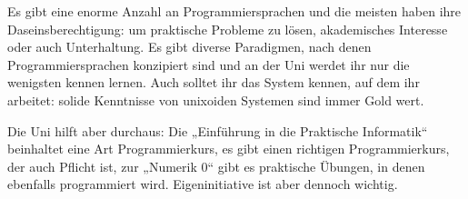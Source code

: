 Es gibt eine enorme Anzahl an Programmiersprachen und die meisten haben ihre
Daseinsberechtigung: um praktische Probleme zu lösen, akademisches Interesse
oder auch Unterhaltung. Es gibt diverse Paradigmen, nach denen
Programmiersprachen konzipiert sind und an der Uni werdet ihr nur die wenigsten
kennen lernen. Auch solltet ihr das System kennen, auf dem ihr arbeitet: solide
Kenntnisse von unixoiden Systemen sind immer Gold wert.

Die Uni hilft aber durchaus: Die „Einführung in die Praktische Informatik“
beinhaltet eine Art Programmierkurs, es gibt einen richtigen Programmierkurs,
der auch Pflicht ist, zur „Numerik 0“ gibt es praktische Übungen, in denen
ebenfalls programmiert wird. Eigeninitiative ist aber dennoch wichtig.

\vspace{-\parskip}
